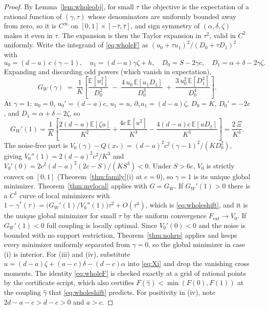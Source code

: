 \documentclass[11pt]{article}
\theoremstyle{remark}
\newcommand{\E}{\mathbb{E}}
\begin{document}
\begin{proof}
By Lemma~\ref{lem:wholeobj}, for small $\tau$ the objective is the
expectation of a rational function of $(\gamma, \tau)$ whose denominators
are uniformly bounded away from zero, so it is $C^\infty$ on
$[0,1] \times [-\bar\tau, \bar\tau]$, and sign symmetry of
$(\alpha,\delta,\zeta)$ makes it even in $\tau$. The expansion is then the
Taylor expansion in $\tau^2$, valid in $C^2$ uniformly. Write the
integrand of \eqref{eq:wholeF} as $(u_0 + \tau u_1)^2/(D_0 + \tau D_1)^2$
with
\[
  u_0 = (d-a)\,c\,(\gamma - 1), \quad
  u_1 = (d-a)\gamma\zeta + h, \quad
  D_0 = S - 2\gamma c, \quad
  D_1 = \alpha + \delta - 2\gamma\zeta.
\]
Expanding and discarding odd powers (which vanish in expectation),
\begin{equation}
  G_W(\gamma) \;=\; \frac{1}{K}\left[
    \frac{\E[u_1^2]}{D_0^2}
    \;-\; \frac{4\,u_0\,\E[u_1 D_1]}{D_0^3}
    \;+\; \frac{3\,u_0^2\,\E[D_1^2]}{D_0^4}
  \right].
  \label{eq:GW}
\end{equation}
At $\gamma = 1$: $u_0 = 0$, $u_0' = (d-a)c$, $u_1 = u$,
$\partial_\gamma u_1 = (d-a)\zeta$, $D_0 = K$, $D_0' = -2c$, and
$D_1 = \alpha + \delta - 2\zeta$, so
\[
  G_W'(1) = \frac{1}{K}\left[
    \frac{2(d-a)\E[\zeta u]}{K^2} + \frac{4c\,\E[u^2]}{K^3}
    - \frac{4(d-a)c\,\E[u D_1]}{K^3}
  \right] = \frac{2\,\Xi}{K^4}.
\]
The noise-free part is $V_0(\gamma) - Q(x_*) =
(d-a)^2 c^2 (\gamma-1)^2 / (K D_0^2)$, giving $V_0''(1) = 2(d-a)^2c^2/K^3$
and $V_0'(0) = 2c^2(d-a)^2(2c - S)/(K S^3) < 0$. Under $S > 6c$, $V_0$ is
strictly convex on $[0,1]$ (Theorem~\ref{thm:family}(i) at $e = 0$), so
$\gamma = 1$ is its unique global minimizer. Theorem~\ref{thm:mvlocal}
applies with $G = G_W$. If $G_W'(1) > 0$ there is a $C^1$ curve of local
minimizers with $1 - \gamma^*(\tau) = \big(G_W'(1)/V_0''(1)\big)\tau^2 +
O(\tau^4)$, which is \eqref{eq:wholeshift}, and it is the unique global
minimizer for small $\tau$ by the uniform convergence
$F_{\mathrm{ext}} \to V_0$. If $G_W'(1) < 0$ full coupling is locally
optimal. Since $V_0'(0) < 0$ and the noise is bounded with no support
restriction, Theorem~\ref{thm:nohrp} applies and keeps every minimizer
uniformly separated from $\gamma = 0$, so the global minimizer in case
(i) is interior. For (iii) and (iv), substitute
$u = (d-a)\zeta + (a-c)\delta - (d-c)\alpha$ into \eqref{eq:Xi} and drop
the vanishing cross moments. The identity \eqref{eq:wholeF} is checked
exactly at a grid of rational points by the certificate script, which
also certifies $F(\hat\gamma) < \min(F(0), F(1))$ at the coupling
$\hat\gamma$ that \eqref{eq:wholeshift} predicts. For positivity in (iv),
note $2d - a - c > d - c > 0$ and $a > c$.
\end{proof}
\end{document}
